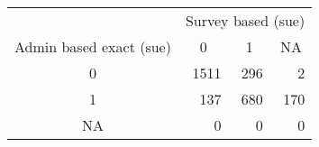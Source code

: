 \begin{tabular}{crrr}
      & \multicolumn{3}{c}{Survey based (sue)} \\
\cmidrule{2-4}Admin based exact (sue) & \multicolumn{1}{c}{0} & \multicolumn{1}{c}{1} & \multicolumn{1}{c}{NA} \\
\cmidrule{2-4}0     & 1511  & 296   & 2 \\
1     & 137   & 680   & 170 \\
NA    & 0     & 0     & 0 \\
\cmidrule{2-4}\end{tabular}%
